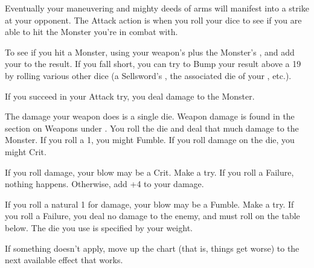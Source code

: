 \begin{multicols*}{2}

  Eventually your maneuvering and mighty deeds of arms will manifest into a strike at your opponent. The Attack action is when you roll your dice to see if you are able to hit the Monster you're in combat with.

  To see if you hit a Monster, \RO using your weapon's  plus the Monster's , and add your \LVL to the result. If you fall short, you can try to Bump your result above a 19 by rolling various other dice (a Sellsword's , the associated die of your , etc.).

  If you succeed in your Attack try, you deal damage to the Monster.

\end{multicols*}


  The damage your weapon does is a single die. Weapon damage is found in the section on Weapons under .  You roll the die and deal that much damage to the Monster.  If you roll a 1, you might Fumble.  If you roll \MAX damage on the die, you might Crit.




  If you roll \MAX damage, your blow may be a Crit. Make a \RSTRY{\FOC} try.  If you roll a Failure, nothing happens. Otherwise, add +4 to your damage.

  If you roll a natural 1 for damage, your blow may be a Fumble. Make a \RSTRY{\FOC} try. If you roll a Failure, you deal no damage to the enemy, and must roll on the table below. The die you use is specified by your  weight.




If something doesn't apply, move up the chart (that is, things get worse) to the next available effect that works.

